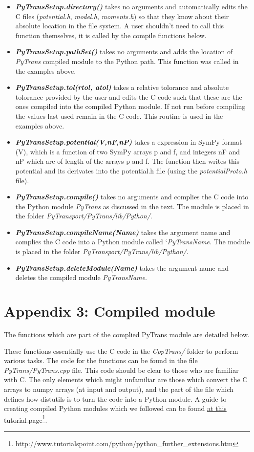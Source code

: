 \documentclass[10pt,
amsmath,amssymb,
aps,prd,nofootinbib,eqsecnum,a4paper]{revtex4}
\newcommand{\CC}{C\nolinebreak\hspace{-.05em}\raisebox{.4ex}{\tiny\bf +}\nolinebreak\hspace{-.10em}\raisebox{.4ex}{\tiny\bf +}}
\def\CC{{C\nolinebreak[4]\hspace{-.05em}\raisebox{.4ex}{\tiny\bf ++}}}
\def\S{ }
\begin{document}
\begin{itemize}
\item    {\it \bf PyTransSetup.directory()} takes no arguments and automatically edits the \CC \S files ({\it potential.h}, {\it model.h}, {\it moments.h}) so that they know about their absolute location in the file system. A user shouldn't need to call this function themselves, it is called by the compile functions below.
\item    {\it \bf PyTransSetup.pathSet()} takes no arguments and adds the location of {\it PyTrans} compiled module to the Python path. This function was called in the examples above.
\item    {\it \bf PyTransSetup.tol(rtol, atol)} takes a relative tolorance and absolute tolorance provided by the user and edits the \CC \S code such that these are the ones compiled into the compiled Python module. If not run before compiling the values last used remain in the \CC \S code. This routine is used in the examples above.
\item    {\it \bf PyTransSetup.potential(V,nF,nP)} takes a expression in SymPy format (V), which is a function of two SymPy arrays p and f, and integers nF and nP which are of length of the arrays p and f. The function then writes this potential and its derivates into the potential.h file (using the {\it potentialProto.h} file).

\item    {\it \bf PyTransSetup.compile()}  takes no arguments and complies the \CC \S  code into the Python module 
{\it PyTrans} as discussed in the text. The module is placed in the folder {\it PyTransport/PyTrans/lib/Python/}.
\item {\it \bf PyTransSetup.compileName(Name)} takes the argument name and complies the \CC \S  code into a Python module called `{\it PyTransName}. The module is placed in the folder {\it PyTransport/PyTrans/lib/Python/}.
\item {\it \bf PyTransSetup.deleteModule(Name)} takes the argument name and deletes the compiled module {\it PyTransName}.
\end{itemize}

\section*{Appendix 3: Compiled module }

The functions which are part of the complied PyTrans module are detailed below. 

These functions essentially use the \CC \S  code in the {\it CppTrans/} folder to perform various tasks. 
The code for the functions can be found in the file {\it PyTrans/PyTrans.cpp} file. This code 
should be clear to those who are familiar with \CC. The only elements which might unfamiliar are those which 
convert the \CC \S  arrays to numpy arrays (at input and output), and the part of the file which defines how distutils 
is to turn the code into a Python module. A guide to creating compiled Python modules which we followed can be found \href{http://www.tutorialspoint.com/python/python_further_extensions.htm}{at this tutorial page}\footnote{\rm http://www.tutorialspoint.com/python/python\_further\_extensions.htm}.
\end{document}
